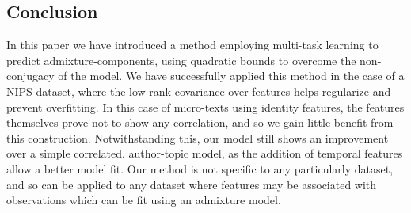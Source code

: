 \subsection{Conclusion}
In this paper we have introduced a method employing multi-task learning to predict admixture-components, using quadratic bounds to overcome the non-conjugacy of the model. We have successfully applied this method in the case of a NIPS dataset, where the low-rank covariance over features helps regularize and prevent overfitting. In this case of micro-texts using identity features, the features themselves prove not to show any correlation, and so we gain little benefit from this construction. Notwithstanding this, our model still shows an improvement over a simple correlated. author-topic model, as the addition of temporal features allow a better model fit. Our method is not specific to any particularly dataset, and so can be applied to any dataset where features may be associated with observations which can be fit using an admixture model.


%



